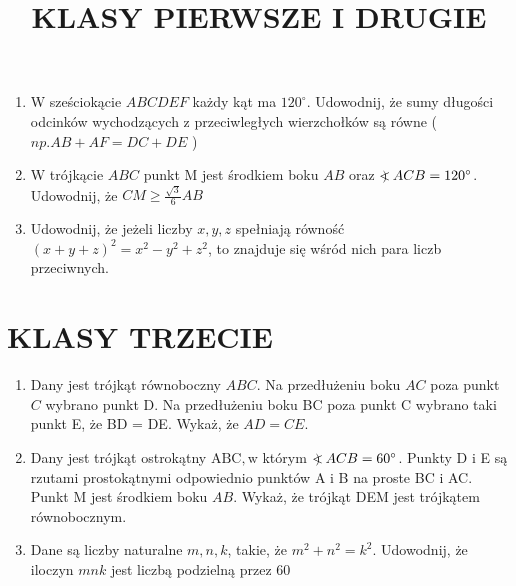 \documentclass[10pt]{article}
\title{KLASY PIERWSZE I DRUGIE }
\author{}
\date{}
\newcommand\Varangle{\mathop{{<\!\!\!\!\!\text{\small)}}\:}\nolimits}
\begin{document}
\maketitle
\begin{enumerate}
  \item W sześciokącie \(A B C D E F\) każdy kąt ma \(120^{\circ}\). Udowodnij, że sumy długości odcinków wychodzących z przeciwległych wierzchołków są równe ( \(n p . A B+A F=D C+D E\) )
  \item W trójkącie \(A B C\) punkt M jest środkiem boku \(A B\) oraz \(\Varangle A C B=120^{\circ}\). Udowodnij, że \(C M \geq \frac{\sqrt{3}}{6} A B\)
  \item Udowodnij, że jeżeli liczby \(x, y, z\) spełniają równość \((x+y+z)^{2}=x^{2}-y^{2}+z^{2}\), to znajduje się wśród nich para liczb przeciwnych.
\end{enumerate}

\section*{KLASY TRZECIE}
\begin{enumerate}
  \item Dany jest trójkąt równoboczny \(A B C\). Na przedłużeniu boku \(A C\) poza punkt \(C\) wybrano punkt D. Na przedłużeniu boku BC poza punkt C wybrano taki punkt E, że BD = DE. Wykaż, że \(A D=C E\).
  \item Dany jest trójkąt ostrokątny \(\mathrm{ABC}, \mathrm{w}\) którym \(\Varangle A C B=60^{\circ}\). Punkty D i E są rzutami prostokątnymi odpowiednio punktów A i B na proste BC i AC. Punkt M jest środkiem boku \(A B\). Wykaż, że trójkąt DEM jest trójkątem równobocznym.
  \item Dane są liczby naturalne \(m, n, k\), takie, że \(m^{2}+n^{2}=k^{2}\). Udowodnij, że iloczyn \(m n k\) jest liczbą podzielną przez 60
\end{enumerate}
\end{document}
